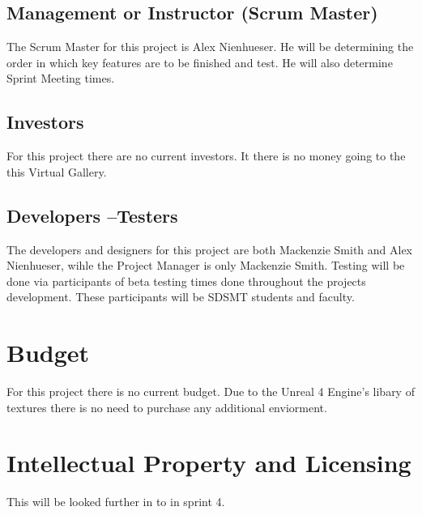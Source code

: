\subsection{Management or Instructor (Scrum Master)}
The Scrum Master for this project is Alex Nienhueser. He will be determining the order in which key features are to be finished and test. He will also determine Sprint Meeting times. 


\subsection{Investors}
For this project there are no current investors. It there is no money going to the this Virtual Gallery.


\subsection{Developers --Testers}
The developers and designers for this project are both Mackenzie Smith and Alex Nienhueser, wihle the Project Manager is only Mackenzie Smith. Testing will be done via participants of beta testing times done throughout the projects development. These participants will be SDSMT students and faculty. 

\section{Budget}
For this project there is no current budget. Due to the Unreal 4 Engine's libary of textures there is no need to purchase any additional enviorment. 

\section{Intellectual Property and Licensing}
This will be looked further in to in sprint 4.


